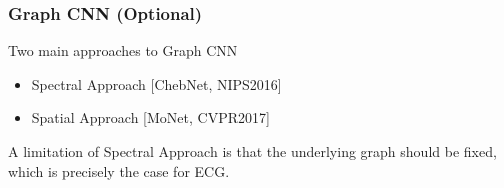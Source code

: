 \documentclass{beamer}
\begin{document}
\begin{frame}
  \frametitle{Graph CNN (Optional)}
  Two main approaches to Graph CNN
  \begin{itemize}
  \item Spectral Approach [ChebNet, NIPS2016]
  \item Spatial Approach [MoNet, CVPR2017]
  \end{itemize}
  A limitation of Spectral Approach is that the underlying graph should be fixed, which is precisely the case for ECG.
\end{frame}

\end{document}
